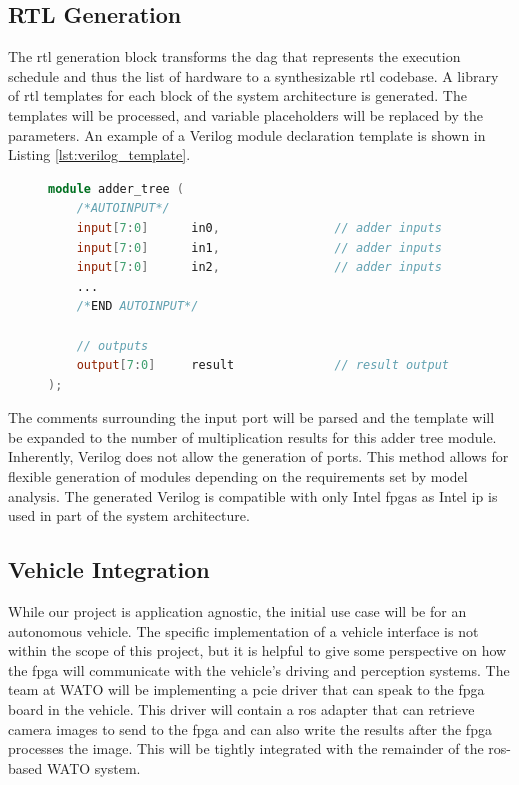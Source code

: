 \documentclass{uw-ece-wkrpt}
\begin{document}
\subsection{RTL Generation}\label{sec:rtl_gen}

The \gls{rtl} generation block transforms the \gls{dag} that represents the execution schedule and thus the list of hardware to a synthesizable \gls{rtl} codebase. A library of \gls{rtl} templates for each block of the system architecture is generated. The templates will be processed, and variable placeholders will be replaced by the parameters. An example of a Verilog module declaration template is shown in Listing \ref{lst:verilog_template}.

\begin{figure}
\centering
\begin{lstlisting}[caption={Verilog template}, label=lst:verilog_template, language=Verilog]
module adder_tree (
    /*AUTOINPUT*/
    input[7:0]      in0,                // adder inputs
    input[7:0]      in1,                // adder inputs
    input[7:0]      in2,                // adder inputs
    ...
    /*END AUTOINPUT*/

    // outputs
    output[7:0]     result              // result output
);
\end{lstlisting}
\end{figure}

The comments surrounding the input port will be parsed and the template will be expanded to the number of multiplication results for this adder tree module. Inherently, Verilog does not allow the generation of ports. This method allows for flexible generation of modules depending on the requirements set by model analysis. The generated Verilog is compatible with only Intel \glspl{fpga} as Intel \gls{ip} is used in part of the system architecture.

\subsection{Vehicle Integration}

While our project is application agnostic, the initial use case will be for an autonomous vehicle. The specific implementation of a vehicle interface is not within the scope of this project, but it is helpful to give some perspective on how the \gls{fpga} will communicate with the vehicle's driving and perception systems. The team at WATO will be implementing a \gls{pcie} driver that can speak to the \gls{fpga} board in the vehicle. This driver will contain a \gls{ros} adapter that can retrieve camera images to send to the \gls{fpga} and can also write the results after the \gls{fpga} processes the image. This will be tightly integrated with the remainder of the \gls{ros}-based WATO system.
\end{document}

